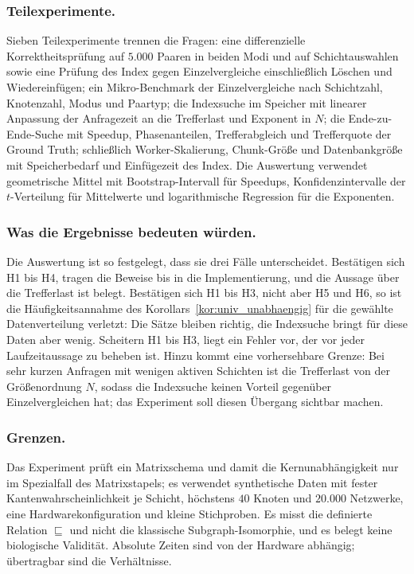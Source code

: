 \documentclass[a4paper,12pt, twoside]{report}
\theoremstyle{definition}
\begin{document}
\subsubsection{Teilexperimente.} Sieben Teilexperimente trennen die Fragen: eine differenzielle Korrektheitsprüfung auf $5.000$ Paaren in beiden Modi und auf Schichtauswahlen sowie eine Prüfung des Index gegen Einzelvergleiche einschließlich Löschen und Wiedereinfügen; ein Mikro-Benchmark der Einzelvergleiche nach Schichtzahl, Knotenzahl, Modus und Paartyp; die Indexsuche im Speicher mit linearer Anpassung der Anfragezeit an die Trefferlast und Exponent in $N$; die Ende-zu-Ende-Suche mit Speedup, Phasenanteilen, Trefferabgleich und Trefferquote der Ground Truth; schließlich Worker-Skalierung, Chunk-Größe und Datenbankgröße mit Speicherbedarf und Einfügezeit des Index. Die Auswertung verwendet geometrische Mittel mit Bootstrap-Intervall für Speedups, Konfidenzintervalle der $t$-Verteilung für Mittelwerte und logarithmische Regression für die Exponenten.

\subsubsection{Was die Ergebnisse bedeuten würden.} Die Auswertung ist so festgelegt, dass sie drei Fälle unterscheidet. Bestätigen sich H1 bis H4, tragen die Beweise bis in die Implementierung, und die Aussage über die Trefferlast ist belegt. Bestätigen sich H1 bis H3, nicht aber H5 und H6, so ist die Häufigkeitsannahme des Korollars~\ref{kor:univ_unabhaengig} für die gewählte Datenverteilung verletzt: Die Sätze bleiben richtig, die Indexsuche bringt für diese Daten aber wenig. Scheitern H1 bis H3, liegt ein Fehler vor, der vor jeder Laufzeitaussage zu beheben ist. Hinzu kommt eine vorhersehbare Grenze: Bei sehr kurzen Anfragen mit wenigen aktiven Schichten ist die Trefferlast von der Größenordnung $N$, sodass die Indexsuche keinen Vorteil gegenüber Einzelvergleichen hat; das Experiment soll diesen Übergang sichtbar machen.

\subsubsection{Grenzen.} Das Experiment prüft ein Matrixschema und damit die Kernunabhängigkeit nur im Spezialfall des Matrixstapels; es verwendet synthetische Daten mit fester Kantenwahrscheinlichkeit je Schicht, höchstens $40$ Knoten und $20.000$ Netzwerke, eine Hardwarekonfiguration und kleine Stichproben. Es misst die definierte Relation $\sqsubseteq$ und nicht die klassische Subgraph-Isomorphie, und es belegt keine biologische Validität. Absolute Zeiten sind von der Hardware abhängig; übertragbar sind die Verhältnisse.
\end{document}
